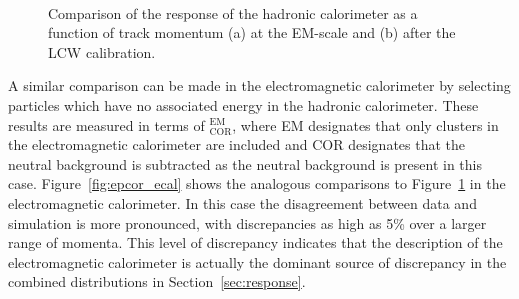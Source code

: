 \begin{figure}[h]
\centering
{}
~
\caption{Comparison of the response of the hadronic calorimeter as a function of track momentum (a) at the EM-scale and (b) after the LCW calibration.}
\label{fig:epav_hcal}
\end{figure}

A similar comparison can be made in the electromagnetic calorimeter by selecting particles which have no associated energy in the hadronic calorimeter. 
These results are measured in terms of \epav$_{\mathrm{COR}}^{\mathrm{EM}}$, where EM designates that only clusters in the electromagnetic calorimeter are included and COR designates that the neutral background is subtracted as the neutral background is present in this case.
Figure~\ref{fig:epcor_ecal} shows the analogous comparisons to Figure~\ref{fig:epav_hcal} in the electromagnetic calorimeter.
In this case the disagreement between data and simulation is more pronounced, with discrepancies as high as 5\% over a larger range of momenta.
This level of discrepancy indicates that the description of the electromagnetic calorimeter is actually the dominant source of discrepancy in the combined distributions in Section~\ref{sec:response}. 


